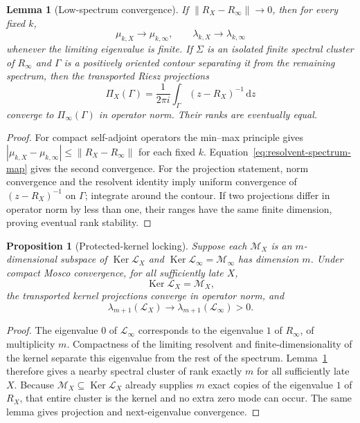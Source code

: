 \documentclass[11pt]{article}
\newtheorem{proposition}[theorem]{Proposition}
\newtheorem{lemma}[theorem]{Lemma}
\theoremstyle{definition}
\theoremstyle{remark}
\newcommand{\dd}{\mathrm d}
\newcommand{\Ker}{\operatorname{Ker}}
\newcommand{\norm}[1]{\lVert#1\rVert}
\newcommand{\M}{\mathcal M}
\begin{document}
\begin{lemma}[Low-spectrum convergence]
\label{lem:low-spectrum-convergence}
If $\norm{R_X-R_\infty}\to0$, then for every fixed $k$,
\begin{equation}
\mu_{k,X}\to\mu_{k,\infty},
\qquad
\lambda_{k,X}\to\lambda_{k,\infty}
\label{eq:low-spectrum-convergence}
\end{equation}
whenever the limiting eigenvalue is finite.  If $\Sigma$ is an isolated finite
spectral cluster of $R_\infty$ and $\Gamma$ is a positively oriented contour
separating it from the remaining spectrum, then the transported Riesz
projections
\begin{equation}
\Pi_X(\Gamma)
=\frac{1}{2\pi i}\int_\Gamma(z-R_X)^{-1}\,\dd z
\label{eq:riesz-projection}
\end{equation}
converge to $\Pi_\infty(\Gamma)$ in operator norm.  Their ranks are eventually
equal.
\end{lemma}

\begin{proof}
For compact self-adjoint operators the min--max principle gives
$|\mu_{k,X}-\mu_{k,\infty}|\le\norm{R_X-R_\infty}$ for each fixed $k$.
Equation~\eqref{eq:resolvent-spectrum-map} gives the second convergence.
For the projection statement, norm convergence and the resolvent identity
imply uniform convergence of $(z-R_X)^{-1}$ on $\Gamma$; integrate around the
contour.  If two projections differ in operator norm by less than one, their
ranges have the same finite dimension, proving eventual rank stability.
\end{proof}

\begin{proposition}[Protected-kernel locking]
\label{prop:protected-kernel-locking}
Suppose each $\M_X$ is an $m$-dimensional subspace of
$\Ker\mathscr L_X$ and
$\Ker\mathscr L_\infty=\M_\infty$ has dimension $m$.  Under compact Mosco
convergence, for all sufficiently late $X$,
\[
\Ker\mathscr L_X=\M_X,
\]
the transported kernel projections converge in operator norm, and
\[
\lambda_{m+1}(\mathscr L_X)
\to\lambda_{m+1}(\mathscr L_\infty)>0.
\]
\end{proposition}

\begin{proof}
The eigenvalue $0$ of $\mathscr L_\infty$ corresponds to the eigenvalue $1$
of $R_\infty$, of multiplicity $m$.  Compactness of the limiting resolvent and
finite-dimensionality of the kernel separate this eigenvalue from the rest of
the spectrum.  Lemma~\ref{lem:low-spectrum-convergence} therefore gives a
nearby spectral cluster of rank exactly $m$ for all sufficiently late $X$.
Because $\M_X\subseteq\Ker\mathscr L_X$ already supplies $m$ exact copies of
the eigenvalue $1$ of $R_X$, that entire cluster is the kernel and no extra
zero mode can occur.  The same lemma gives projection and next-eigenvalue
convergence.
\end{proof}
\end{document}
